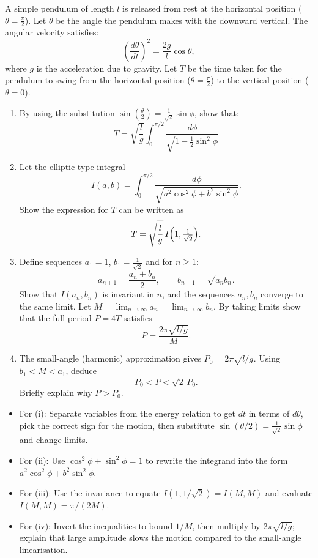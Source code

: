 \begin{problem}

\noindent 

A simple pendulum of length $l$ is released from rest at the horizontal position 
($\theta=\tfrac{\pi}{2}$). 
Let $\theta$ be the angle the pendulum makes with the downward vertical. 
The angular velocity satisfies:
\[
\left(\frac{d\theta}{dt}\right)^2=\frac{2g}{l}\cos\theta,
\]
where $g$ is the acceleration due to gravity. Let $T$ be the time taken for the pendulum 
to swing from the horizontal position ($\theta=\tfrac{\pi}{2}$) to the vertical position ($\theta=0$).

\begin{enumerate}[label=(\roman*)]
    \item By using the substitution $\sin(\tfrac{\theta}{2}) = \tfrac{1}{\sqrt{2}}\sin\phi$, show that:
    \[
    T=\sqrt{\frac{l}{g}}\int_{0}^{\pi/2}\frac{d\phi}{\sqrt{1-\tfrac{1}{2}\sin^2\phi}}
    \]

    \item Let the elliptic-type integral
    \[
    I(a,b)=\int_0^{\pi/2}\frac{d\phi}{\sqrt{a^2\cos^2\phi+b^2\sin^2\phi}}.
    \]
    Show the expression for $T$ can be written as
    \[T=\sqrt{\frac{l}{g}}\,I\Bigl(1,\tfrac{1}{\sqrt2}\Bigr).\]

    \item Define sequences $a_1=1$, $b_1=\tfrac{1}{\sqrt2}$ and for $n\ge1$:
    \[a_{n+1}=\frac{a_n+b_n}{2},\qquad b_{n+1}=\sqrt{a_n b_n}.
    \]
    Show that $I(a_n,b_n)$ is invariant in $n$, and the sequences $a_n, b_n$ converge to the same limit. 
    Let $M=\lim_{n\to\infty} a_n=\lim_{n\to\infty} b_n$. 
    By taking limits show that the full period $P=4T$ satisfies
    \[P=\frac{2\pi\sqrt{l/g}}{M}.
    \]

    \item The small-angle (harmonic) approximation gives $P_0=2\pi\sqrt{l/g}$. Using $b_1<M<a_1$, deduce
    \[P_0 < P < \sqrt{2}\,P_0.
    \]
    Briefly explain why $P>P_0$.
\end{enumerate}

\end{problem}

\begin{hint}
\begin{itemize}
    \item For (i): Separate variables from the energy relation to get $dt$ in terms of $d\theta$, pick the correct sign for the motion, then substitute $\sin(\theta/2)=\tfrac{1}{\sqrt2}\sin\phi$ and change limits.
    \item For (ii): Use $\cos^2\phi+\sin^2\phi=1$ to rewrite the integrand into the form $a^2\cos^2\phi+b^2\sin^2\phi$.
    \item For (iii): Use the invariance to equate $I(1,1/\sqrt2)=I(M,M)$ and evaluate $I(M,M)=\pi/(2M)$.
    \item For (iv): Invert the inequalities to bound $1/M$, then multiply by $2\pi\sqrt{l/g}$; explain that large amplitude slows the motion compared to the small-angle linearisation.
\end{itemize}
\end{hint}

